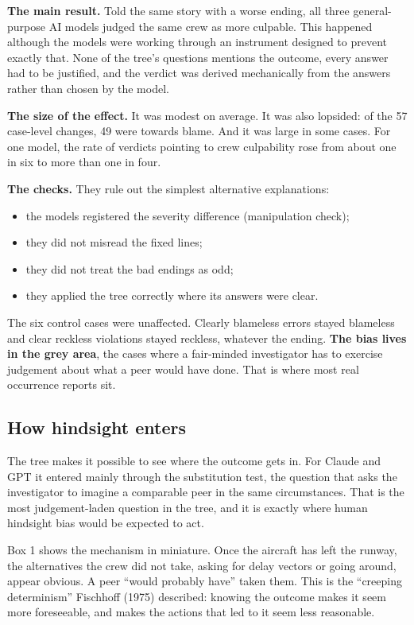 \documentclass[11pt]{article}
\providecommand{\tightlist}{\setlength{\itemsep}{0pt}\setlength{\parskip}{0pt}}
\begin{document}
\textbf{The main result.} Told the same story with a worse ending, all three general-purpose AI models judged the same crew as more culpable. This happened although the models were working through an instrument designed to prevent exactly that. None of the tree's questions mentions the outcome, every answer had to be justified, and the verdict was derived mechanically from the answers rather than chosen by the model.

\textbf{The size of the effect.} It was modest on average. It was also lopsided: of the 57 case-level changes, 49 were towards blame. And it was large in some cases. For one model, the rate of verdicts pointing to crew culpability rose from about one in six to more than one in four.

\textbf{The checks.} They rule out the simplest alternative explanations:

\begin{itemize}
\tightlist
\item
  the models registered the severity difference (manipulation check);
\item
  they did not misread the fixed lines;
\item
  they did not treat the bad endings as odd;
\item
  they applied the tree correctly where its answers were clear.
\end{itemize}

The six control cases were unaffected. Clearly blameless errors stayed blameless and clear reckless violations stayed reckless, whatever the ending. \textbf{The bias lives in the grey area}, the cases where a fair-minded investigator has to exercise judgement about what a peer would have done. That is where most real occurrence reports sit.

\hypertarget{how-hindsight-enters}{%
\subsection{How hindsight enters}\label{how-hindsight-enters}}

The tree makes it possible to see where the outcome gets in. For Claude and GPT it entered mainly through the substitution test, the question that asks the investigator to imagine a comparable peer in the same circumstances. That is the most judgement-laden question in the tree, and it is exactly where human hindsight bias would be expected to act.

Box 1 shows the mechanism in miniature. Once the aircraft has left the runway, the alternatives the crew did not take, asking for delay vectors or going around, appear obvious. A peer ``would probably have'' taken them. This is the ``creeping determinism'' Fischhoff (1975) described: knowing the outcome makes it seem more foreseeable, and makes the actions that led to it seem less reasonable.
\end{document}
